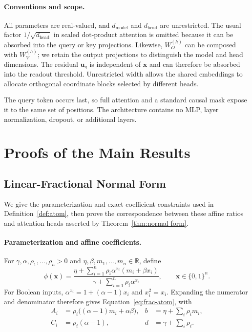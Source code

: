 \documentclass{article}
\theoremstyle{definition}
\theoremstyle{plain}
\newcommand{\bits}{\{0,1\}}
\begin{document}
\paragraph{Conventions and scope.}
All parameters are real-valued, and $d_{\mathrm{model}}$ and $d_{\mathrm{head}}$ are unrestricted. The usual factor $1/\sqrt{d_{\mathrm{head}}}$ in scaled dot-product attention is omitted because it can be absorbed into the query or key projections. Likewise, $W_O^{(h)}$ can be composed with $W_V^{(h)}$; we retain the output projections to distinguish the model and head dimensions. The residual $\mathbf{u}_q$ is independent of $\mathbf{x}$ and can therefore be absorbed into the readout threshold. Unrestricted width allows the shared embeddings to allocate orthogonal coordinate blocks selected by different heads.

The query token occurs last, so full attention and a standard causal mask expose it to the same set of positions. The architecture contains no MLP, layer normalization, dropout, or additional layers.

\section{Proofs of the Main Results}
\label{app:proofs}

\subsection{Linear-Fractional Normal Form}
\label{app:proof-normal-form}

We give the parameterization and exact coefficient constraints used in Definition~\ref{def:atom}, then prove the correspondence between these affine ratios and attention heads asserted by Theorem~\ref{thm:normal-form}.

\paragraph{Parameterization and affine coefficients.}
For $\gamma,\alpha,\rho_1,\ldots,\rho_n>0$ and $\eta,\beta,m_1,\ldots,m_n\in\mathbb{R}$, define
\begin{equation}
\phi(\mathbf{x})=
\frac{\eta+\sum_{i=1}^{n}\rho_i\alpha^{x_i}(m_i+\beta x_i)}
{\gamma+\sum_{i=1}^{n}\rho_i\alpha^{x_i}},
\qquad \mathbf{x}\in\bits^n.
\label{eq:atom-parameterization}
\end{equation}
For Boolean inputs, $\alpha^{x_i}=1+(\alpha-1)x_i$ and $x_i^2=x_i$. Expanding the numerator and denominator therefore gives Equation~\eqref{eq:frac-atom}, with
\begin{equation}
\begin{aligned}
A_i&=\rho_i\bigl((\alpha-1)m_i+\alpha\beta\bigr),
& b&=\eta+\sum_i\rho_i m_i,\\
C_i&=\rho_i(\alpha-1),
& d&=\gamma+\sum_i\rho_i.
\end{aligned}
\label{eq:affine-atom-coefficients}
\end{equation}
\end{document}

